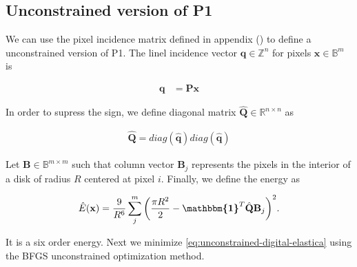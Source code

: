 \subsection{Unconstrained version of P1}

We can use the pixel incidence matrix defined in appendix () to define a unconstrained version of P1. The linel incidence vector $\mathbf{q} \in \mathbb{Z}^n$ for pixels $\mathbf{x} \in \mathbb{B}^{m}$ is 
	
	\begin{align*}
		\mathbf{q} &= \mathbf{P} \mathbf{x}
	\end{align*}

In order to supress the sign, we define diagonal matrix $\mathbf{\hat{Q}} \in \mathbb{R}^{n \times n }$ as

\begin{align*}
	\mathbf{\hat{Q}} = diag(\mathbf{\hat{q}})diag(\mathbf{\hat{q}})
\end{align*}

Let $\mathbf{B} \in \mathbb{B}^{m\times m}$ such that column vector $\mathbf{B}_j$ represents the pixels in the interior of a disk of radius $R$ centered at pixel $i$. Finally, we define the energy as

\begin{align}
	\hat{E}(\mathbf{x}) = \frac{9}{R^6}\sum_{j}^{m}{\left( \frac{\pi R^2}{2} - \boldsymbol{\mathbbm{1}}^T\hat{\mathbf{Q}}\mathbf{B}_j \right)^2}.
	\label{eq:unconstrained-digital-elastica}
\end{align}


It is a six order energy. Next we minimize \eqref{eq:unconstrained-digital-elastica} using the BFGS unconstrained optimization method.

%

